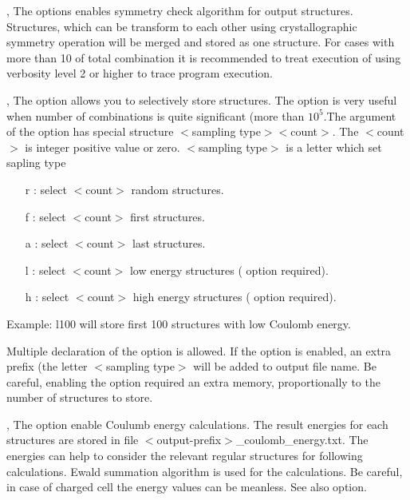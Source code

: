 \documentclass[a4paper,english]{article}
\begin{document}
\begin{Description}
\item[\Opt{-m}, \Opt{\Dd merge-by-distance}]
      The options enables symmetry check algorithm for output structures. Structures, which can be transform to each other using crystallographic symmetry operation will be merged and stored as one structure. For cases with more than 10 of  total combination it is recommended to treat execution of  using verbosity level 2 or higher to trace program execution.
      
\item[\OptArg{-n }{selection}, \OptArg{\Dd store-structures=}{selection}]
      The option allows you to selectively store structures. The option is very useful when number of combinations is quite significant (more than $10^5$.The argument of the option has special structure $<$sampling type$><$count$>$. The $<$count$>$ is integer positive value or zero. $<$sampling type$>$ is a letter which set sapling type
      \begin{itemize}
        \item[r]: select $<$count$>$ random structures.
        \item[f]: select $<$count$>$ first structures.
        \item[a]: select $<$count$>$ last structures.
        \item[l]: select $<$count$>$ low energy structures ( option required).
        \item[h]: select $<$count$>$ high energy structures ( option required).
      \end{itemize}
      Example: l100 will store first 100 structures with low Coulomb energy.
      
      Multiple declaration of the option is allowed. If the option is enabled, an extra prefix (the letter $<$sampling type$>$ will be added to output file name. Be careful, enabling the option required an extra memory, proportionally to the number of structures to store.

\item[\Opt{-q}, \Opt{\Dd coulomb-energy}] 
      The option enable Coulumb energy calculations. The result energies for each structures are stored in file $<$output-prefix$>$\_coulomb\_energy.txt. The energies can help to consider the relevant regular structures for following calculations. Ewald summation algorithm is used for the calculations. Be careful, in case of charged cell the energy values can be meanless. See also  option.
      

\end{Description}
\end{document}
